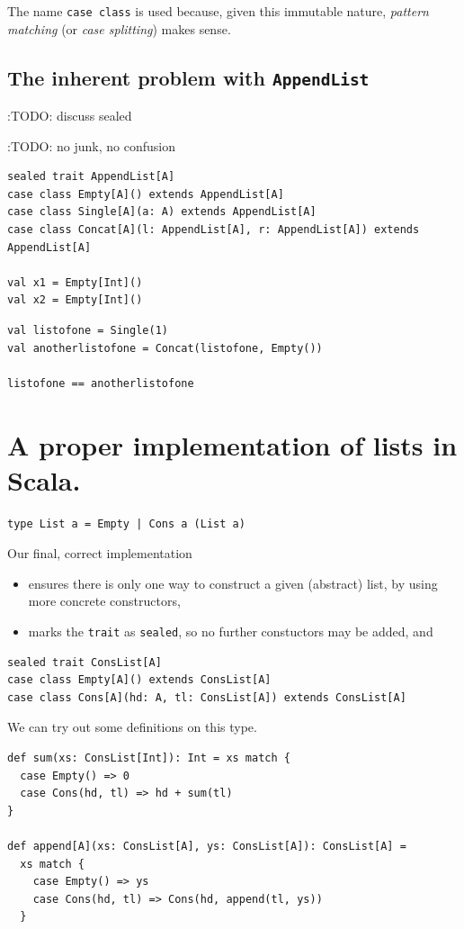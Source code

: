 \documentclass[11pt]{article}
\begin{document}
The name \texttt{case class} is used because,
given this immutable nature,
\emph{pattern matching} (or \emph{case splitting})
makes sense.

\subsection{The inherent problem with \texttt{AppendList}}
\label{sec:org06c4efd}
:TODO: discuss sealed

:TODO: no junk, no confusion

\begin{verbatim}
sealed trait AppendList[A]
case class Empty[A]() extends AppendList[A]
case class Single[A](a: A) extends AppendList[A]
case class Concat[A](l: AppendList[A], r: AppendList[A]) extends AppendList[A]

val x1 = Empty[Int]()
val x2 = Empty[Int]()
\end{verbatim}

\begin{verbatim}
val listofone = Single(1)
val anotherlistofone = Concat(listofone, Empty())

listofone == anotherlistofone
\end{verbatim}

\section{A proper implementation of lists in Scala.}
\label{sec:org566911e}
\begin{verbatim}
type List a = Empty | Cons a (List a)
\end{verbatim}

Our final, correct implementation
\begin{itemize}
\item ensures there is only one way to construct a given (abstract) list,
by using more concrete constructors,
\item marks the \texttt{trait} as \texttt{sealed}, so no further constuctors may be added, and
\end{itemize}
\begin{verbatim}
sealed trait ConsList[A]
case class Empty[A]() extends ConsList[A]
case class Cons[A](hd: A, tl: ConsList[A]) extends ConsList[A]
\end{verbatim}

We can try out some definitions on this type.
\begin{verbatim}
def sum(xs: ConsList[Int]): Int = xs match {
  case Empty() => 0
  case Cons(hd, tl) => hd + sum(tl)
}

def append[A](xs: ConsList[A], ys: ConsList[A]): ConsList[A] =
  xs match {
    case Empty() => ys
    case Cons(hd, tl) => Cons(hd, append(tl, ys))
  }
\end{verbatim}
\end{document}
